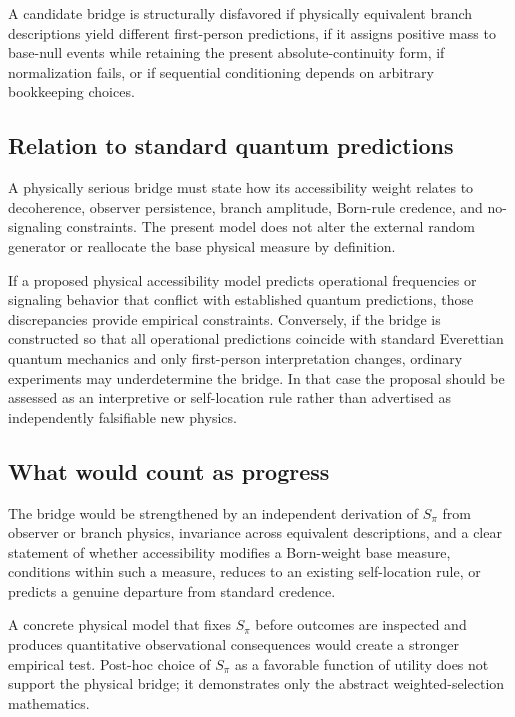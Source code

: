 A candidate bridge is structurally disfavored if physically equivalent branch descriptions yield different first-person predictions, if it assigns positive mass to base-null events while retaining the present absolute-continuity form, if normalization fails, or if sequential conditioning depends on arbitrary bookkeeping choices.

\subsection{Relation to standard quantum predictions}

A physically serious bridge must state how its accessibility weight relates to decoherence, observer persistence, branch amplitude, Born-rule credence, and no-signaling constraints. The present model does not alter the external random generator or reallocate the base physical measure by definition.

If a proposed physical accessibility model predicts operational frequencies or signaling behavior that conflict with established quantum predictions, those discrepancies provide empirical constraints. Conversely, if the bridge is constructed so that all operational predictions coincide with standard Everettian quantum mechanics and only first-person interpretation changes, ordinary experiments may underdetermine the bridge. In that case the proposal should be assessed as an interpretive or self-location rule rather than advertised as independently falsifiable new physics.

\subsection{What would count as progress}

The bridge would be strengthened by an independent derivation of $S_\pi$ from observer or branch physics, invariance across equivalent descriptions, and a clear statement of whether accessibility modifies a Born-weight base measure, conditions within such a measure, reduces to an existing self-location rule, or predicts a genuine departure from standard credence.

A concrete physical model that fixes $S_\pi$ before outcomes are inspected and produces quantitative observational consequences would create a stronger empirical test. Post-hoc choice of $S_\pi$ as a favorable function of utility does not support the physical bridge; it demonstrates only the abstract weighted-selection mathematics.


